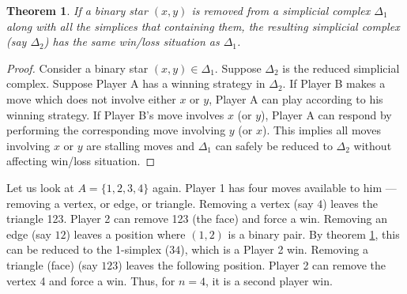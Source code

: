 \documentclass[a4paper, 12pt]{article}
\newtheorem{theorem}{Theorem}[section] %
\theoremstyle{remark} %
\begin{document}
\begin{theorem}
	\label{binarystartheorem}
	If a binary star $(x,y)$ is removed from a simplicial complex $\Delta_1$ along with all the simplices that containing them, the resulting simplicial complex (say $\Delta_2$) has the same win/loss situation as $\Delta_1$. 
\end{theorem}

\begin{proof}
	Consider a binary star $(x,y) \in \Delta_1$. Suppose $\Delta_2$ is the reduced simplicial complex. Suppose Player A has a winning strategy in $\Delta_2$. If Player B makes a move which does not involve either $x$ or $y$, Player A can play according to his winning strategy. If Player B's move involves $x$ (or $y$), Player A can respond by performing the corresponding move involving $y$ (or $x$). This implies all moves involving $x$ or $y$ are stalling moves and $\Delta_1$ can safely be reduced to $\Delta_2$ without affecting win/loss situation.
\end{proof}

Let us look at $A = \{1,2,3,4\}$ again. Player 1 has four moves available to him --- removing a vertex, or edge, or triangle. Removing a vertex (say $4$) leaves the triangle 123. Player 2 can remove 123 (the face) and force a win. Removing an edge (say $12$) leaves a position where $(1,2)$ is a binary pair. By theorem \ref{binarystartheorem}, this can be reduced to the 1-simplex ($34$), which is a Player 2 win. Removing a triangle (face) (say $123$) leaves the following position. Player 2 can remove the vertex 4 and force a win. Thus, for $n=4$, it is a second player win.\\

\begin{center}
	\\
\end{center}
\end{document}
